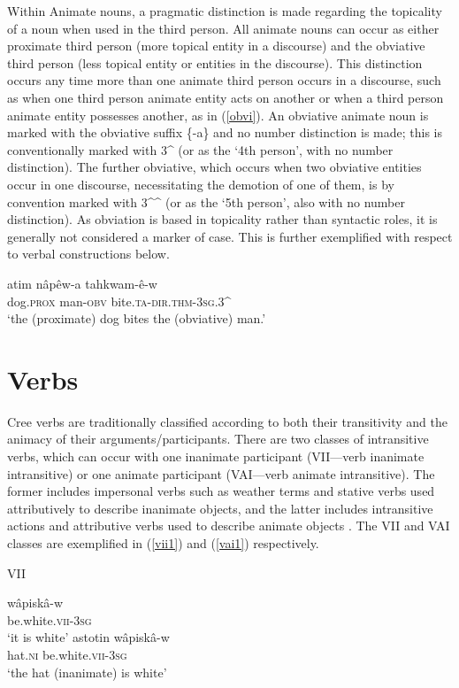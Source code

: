Within Animate nouns, a pragmatic distinction is made regarding the topicality of a noun when used in the third person. All animate nouns can occur as either proximate third person (more topical entity in a discourse) and the obviative third person (less topical entity or entities in the discourse). This distinction occurs any time more than one animate third person occurs in a discourse, such as when one third person animate entity acts on another or when a third person animate entity possesses another, as in (\ref{obvi}). An obviative animate noun is marked with the obviative suffix \{-a\} and no number distinction is made; this is conventionally marked with 3^{\prime} (or as the `4th person', with no number distinction). The further obviative, which occurs when two obviative entities occur in one discourse, necessitating the demotion of one of them, is by convention marked with 3^{\prime}^{\prime} (or as the `5th person', also with no number distinction). As obviation is based in topicality rather than syntactic roles, it is generally not considered a marker of case. This is further exemplified with respect to verbal constructions below.

\begin{exe}
\ex
\gll atim nâpêw-a tahkwam-ê-w \\
dog.\textsc{prox} man-\textsc{obv} bite.\textsc{ta}-\textsc{dir.thm}-3\textsc{sg}.3^{\prime} \\
\trans `the (proximate) dog bites the (obviative) man.'
\label{obvi}
\end{exe}


\section{Verbs}

Cree verbs are traditionally classified according to both their transitivity and the animacy of their arguments/participants. There are two classes of intransitive verbs, which can occur with one inanimate participant (VII---verb inanimate intransitive) or one animate participant (VAI---verb animate intransitive). The former includes impersonal verbs such as weather terms and stative verbs used attributively to describe inanimate objects, and the latter includes intransitive actions and attributive verbs used to describe animate objects \citep{Bloomfield1946,Wolfart1973,Wolfart1996,okimasis2018cree}. The VII and VAI classes are exemplified in (\ref{vii1}) and (\ref{vai1}) respectively.

\begin{exe}
\ex VII
\begin{xlist}
\ex
\gll w\^{a}pisk\^{a}-w \\
be.white.\textsc{vii}-3\textsc{sg} \\
\trans `it is white'
\ex
\gll astotin w\^{a}pisk\^{a}-w \\
hat.\textsc{ni} be.white.\textsc{vii}-3\textsc{sg} \\
\trans `the hat (inanimate) is white'
\end{xlist}
\label{vii1}
\end{exe}

